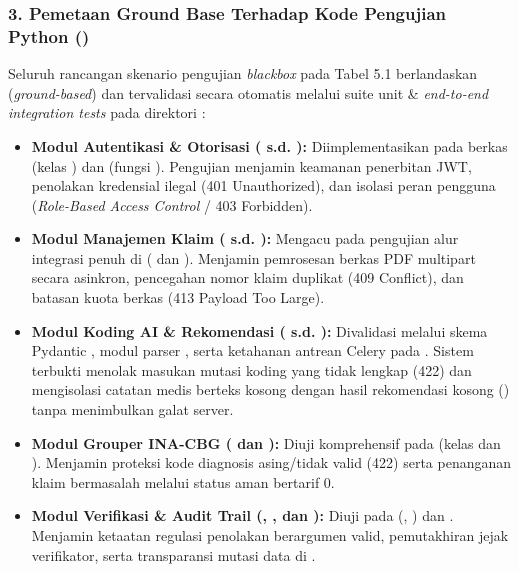 \documentclass[a4paper,landscape,10pt]{article}
\begin{document}
\subsubsection*{3. Pemetaan Ground Base Terhadap Kode Pengujian Python ()}

Seluruh rancangan skenario pengujian \textit{blackbox} pada Tabel 5.1 berlandaskan (\textit{ground-based}) dan tervalidasi secara otomatis melalui suite unit \& \textit{end-to-end integration tests} pada direktori :

\begin{itemize}[leftmargin=1.5em, itemsep=3pt]
    \item \textbf{Modul Autentikasi \& Otorisasi ( s.d. ):} Diimplementasikan pada berkas  (kelas ) dan  (fungsi ). Pengujian menjamin keamanan penerbitan JWT, penolakan kredensial ilegal (401 Unauthorized), dan isolasi peran pengguna (\textit{Role-Based Access Control} / 403 Forbidden).
    \item \textbf{Modul Manajemen Klaim ( s.d. ):} Mengacu pada pengujian alur integrasi penuh di  ( dan ). Menjamin pemrosesan berkas PDF multipart secara asinkron, pencegahan nomor klaim duplikat (409 Conflict), dan batasan kuota berkas (413 Payload Too Large).
    \item \textbf{Modul Koding AI \& Rekomendasi ( s.d. ):} Divalidasi melalui skema Pydantic , modul parser , serta ketahanan antrean Celery pada . Sistem terbukti menolak masukan mutasi koding yang tidak lengkap (422) dan mengisolasi catatan medis berteks kosong dengan hasil rekomendasi kosong () tanpa menimbulkan galat server.
    \item \textbf{Modul Grouper INA-CBG ( dan ):} Diuji komprehensif pada  (kelas  dan ). Menjamin proteksi kode diagnosis asing/tidak valid (422) serta penanganan klaim bermasalah melalui status aman  bertarif 0.
    \item \textbf{Modul Verifikasi \& Audit Trail (, , dan ):} Diuji pada  (, ) dan . Menjamin ketaatan regulasi penolakan berargumen valid, pemutakhiran jejak verifikator, serta transparansi mutasi data di .
\end{itemize}
\end{document}
